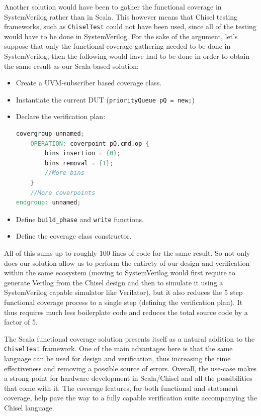\documentclass[conference]{IEEEtran}
\begin{document}
Another solution would have been to gather the functional coverage in SystemVerilog rather than in Scala. This however means that Chisel testing frameworks, such as \texttt{ChiselTest} could not have been used, since all of the testing would have to be done in SystemVerilog. For the sake of the argument, let's suppose that only the functional coverage gathering needed to be done in SystemVerilog, then the following would have had to be done in order to obtain the same result as our Scala-based solution:  
\begin{itemize}
    \item Create a UVM-subscriber based coverage class.
    \item Instantiate the current DUT (\texttt{priorityQueue pQ  = new;})
    \item Declare the verification plan: 
    \begin{lstlisting}[language=verilog]
covergroup unnamed;
	OPERATION: coverpoint pQ.cmd.op {
		bins insertion = {0};
		bins removal = {1};
		//More bins
	}
	//More coverpoints
endgroup: unnamed;
    \end{lstlisting}
    \item Define \texttt{build\_phase} and \texttt{write} functions.
    \item Define the coverage class constructor.
\end{itemize}  
All of this sums up to roughly 100 lines of code for the same result. So not only does our solution allow us to perform the entirety of our design and verification within the same ecosystem (moving to SystemVerilog would first require to generate Verilog from the Chisel design and then to simulate it using a SystemVerilog capable simulator like Verilator), but it also reduces the 5 step functional coverage process to a single step (defining the verification plan). It thus requires much less boilerplate code and reduces the total source code by a factor of 5.  

The Scala functional coverage solution presents itself as a natural addition to the \texttt{ChiselTest} framework. One of the main advantages here is that the same language can be used for design and verification, thus increasing the time effectiveness and removing a possible source of errors. Overall, the use-case makes a strong point for hardware development in Scala/Chisel and all the possibilities that come with it. The coverage features, for both functional and statement coverage, help pave the way to a fully capable verification suite accompanying the Chisel language.
\end{document}
